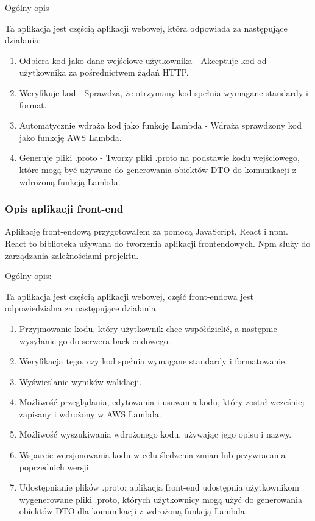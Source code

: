 \documentclass[runningheads,12pt]{llncs}
\begin{document}
Ogólny opis

Ta aplikacja jest częścią aplikacji webowej, która odpowiada za następujące działania:
\begin{enumerate}
    \item Odbiera kod jako dane wejściowe użytkownika - Akceptuje kod od użytkownika za pośrednictwem żądań HTTP.
    \item Weryfikuje kod - Sprawdza, że otrzymany kod spełnia wymagane standardy i format.
    \item Automatycznie wdraża kod jako funkcję Lambda -  Wdraża sprawdzony kod jako funkcję AWS Lambda.
    \item Generuje pliki .proto - Tworzy pliki .proto na podstawie kodu wejściowego, które mogą być używane do generowania obiektów DTO do komunikacji z wdrożoną funkcją Lambda.
\end{enumerate}


\subsubsection{Opis aplikacji front-end}

Aplikację front-endową przygotowałem za pomocą JavaScript, React i npm.  
React to biblioteka używana do tworzenia aplikacji frontendowych.  
Npm służy do zarządzania zależnościami projektu.

Ogólny opis:

Ta aplikacja jest częścią aplikacji webowej, część front-endowa jest odpowiedzialna za następujące działania:
\begin{enumerate}
    \item Przyjmowanie kodu, który użytkownik chce współdzielić, a następnie wysyłanie go do serwera back-endowego.
    \item Weryfikacja tego, czy kod spełnia wymagane standardy i formatowanie.
    \item Wyświetlanie wyników walidacji.
    \item Możliwość przeglądania, edytowania i usuwania kodu, który został wcześniej zapisany i wdrożony w AWS Lambda.
    \item Możliwość wyszukiwania wdrożonego kodu, używając jego opisu i nazwy.
    \item Wsparcie wersjonowania kodu w celu śledzenia zmian lub przywracania poprzednich wersji.
    \item Udostępnianie plików .proto: aplikacja front-end udostępnia użytkownikom wygenerowane pliki .proto, których użytkownicy mogą użyć do generowania obiektów DTO dla komunikacji z wdrożoną funkcją Lambda.
\end{enumerate}
\end{document}
